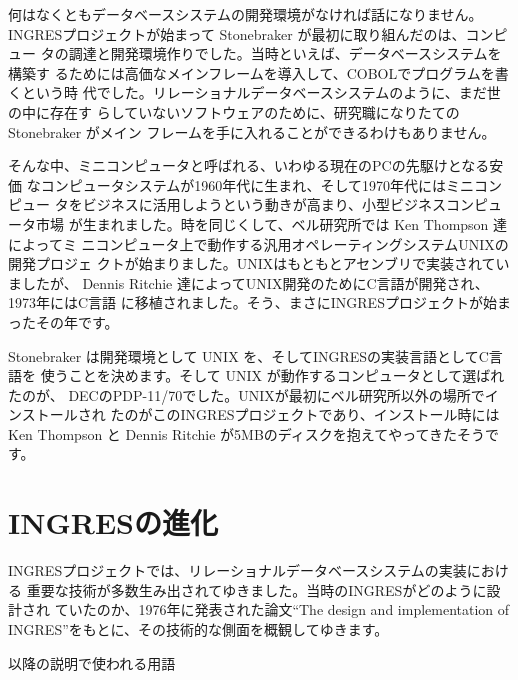 何はなくともデータベースシステムの開発環境がなければ話になりません。
INGRESプロジェクトが始まって Stonebraker が最初に取り組んだのは、コンピュー
タの調達と開発環境作りでした。当時といえば、データベースシステムを構築す
るためには高価なメインフレームを導入して、COBOLでプログラムを書くという時
代でした。リレーショナルデータベースシステムのように、まだ世の中に存在す
らしていないソフトウェアのために、研究職になりたての Stonebraker がメイン
フレームを手に入れることができるわけもありません。

そんな中、ミニコンピュータと呼ばれる、いわゆる現在のPCの先駆けとなる安価
なコンピュータシステムが1960年代に生まれ、そして1970年代にはミニコンピュー
タをビジネスに活用しようという動きが高まり、小型ビジネスコンピュータ市場
が生まれました。時を同じくして、ベル研究所では Ken Thompson 達によってミ
ニコンピュータ上で動作する汎用オペレーティングシステムUNIXの開発プロジェ
クトが始まりました。UNIXはもともとアセンブリで実装されていましたが、
Dennis Ritchie 達によってUNIX開発のためにC言語が開発され、1973年にはC言語
に移植されました。そう、まさにINGRESプロジェクトが始まったその年です。

Stonebraker は開発環境として UNIX を、そしてINGRESの実装言語としてC言語を
使うことを決めます。そして UNIX が動作するコンピュータとして選ばれたのが、
DECのPDP-11/70でした。UNIXが最初にベル研究所以外の場所でインストールされ
たのがこのINGRESプロジェクトであり、インストール時には Ken Thompson と
Dennis Ritchie が5MBのディスクを抱えてやってきたそうです。

\section{INGRESの進化}

INGRESプロジェクトでは、リレーショナルデータベースシステムの実装における
重要な技術が多数生み出されてゆきました。当時のINGRESがどのように設計され
ていたのか、1976年に発表された論文``The design and implementation of
INGRES''をもとに、その技術的な側面を概観してゆきます。

\begin{center}
 \begin{minipage}{0.95\textwidth}
  \begin{screen}
   以降の説明で使われる用語

   \footnotesize


  \end{screen}
 \end{minipage}
\end{center}

